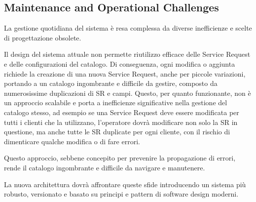 \subsection{Maintenance and Operational Challenges}

La gestione quotidiana del sistema è resa complessa da diverse inefficienze e scelte di progettazione obsolete.

Il design del sistema attuale non permette riutilizzo efficace delle Service Request e delle configurazioni del catalogo. Di conseguenza, ogni modifica o aggiunta richiede la creazione di una nuova Service Request, anche per piccole variazioni, portando a un catalogo ingombrante e difficile da gestire, composto da numerosissime duplicazioni di SR e campi. Questo, per quanto funzionante, non è un approccio scalabile e porta a inefficienze significative nella gestione del catalogo stesso, ad esempio se una Service Request deve essere modificata per tutti i clienti che la utilizzano, l'operatore dovrà modificare non solo la SR in questione, ma anche tutte le SR duplicate per ogni cliente, con il rischio di dimenticare qualche modifica o di fare errori.

Questo approccio, sebbene concepito per prevenire la propagazione di errori, rende il catalogo ingombrante e difficile da navigare e manutenere.

La nuova architettura dovrà affrontare queste sfide introducendo un sistema più robusto, versionato e basato su principi e pattern di software design moderni.